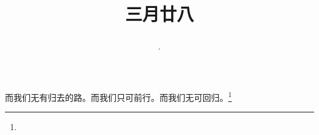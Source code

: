 \title{\date[d=6,m=5,y=2024][year:cn-y,年,month:cn,day:cn,日,·,weekday]·三月廿八 }
而我们无有归去的路。而我们只可前行。而我们无可回归。\footnote{ }

